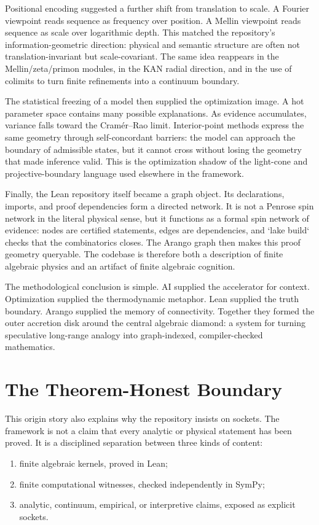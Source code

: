 Positional encoding suggested a further shift from translation to scale.  A
Fourier viewpoint reads sequence as frequency over position.  A Mellin viewpoint
reads sequence as scale over logarithmic depth.  This matched the repository's
information-geometric direction: physical and semantic structure are often not
translation-invariant but scale-covariant.  The same idea reappears in the
Mellin/zeta/primon modules, in the KAN radial direction, and in the use of
colimits to turn finite refinements into a continuum boundary.

The statistical freezing of a model then supplied the optimization image.  A
hot parameter space contains many possible explanations.  As evidence
accumulates, variance falls toward the Cram\'er--Rao limit.  Interior-point
methods express the same geometry through self-concordant barriers: the model
can approach the boundary of admissible states, but it cannot cross without
losing the geometry that made inference valid.  This is the optimization shadow
of the light-cone and projective-boundary language used elsewhere in the
framework.

Finally, the Lean repository itself became a graph object.  Its declarations,
imports, and proof dependencies form a directed network.  It is not a Penrose
spin network in the literal physical sense, but it functions as a formal spin
network of evidence: nodes are certified statements, edges are dependencies, and
`lake build` checks that the combinatorics closes.  The Arango graph then makes
this proof geometry queryable.  The codebase is therefore both a description of
finite algebraic physics and an artifact of finite algebraic cognition.

The methodological conclusion is simple.  AI supplied the accelerator for
context.  Optimization supplied the thermodynamic metaphor.  Lean supplied the
truth boundary.  Arango supplied the memory of connectivity.  Together they
formed the outer accretion disk around the central algebraic diamond: a system
for turning speculative long-range analogy into graph-indexed, compiler-checked
mathematics.

\section{The Theorem-Honest Boundary}

This origin story also explains why the repository insists on sockets.  The
framework is not a claim that every analytic or physical statement has been
proved.  It is a disciplined separation between three kinds of content:
\begin{enumerate}
  \item finite algebraic kernels, proved in Lean;
  \item finite computational witnesses, checked independently in SymPy;
  \item analytic, continuum, empirical, or interpretive claims, exposed as
        explicit sockets.
\end{enumerate}

